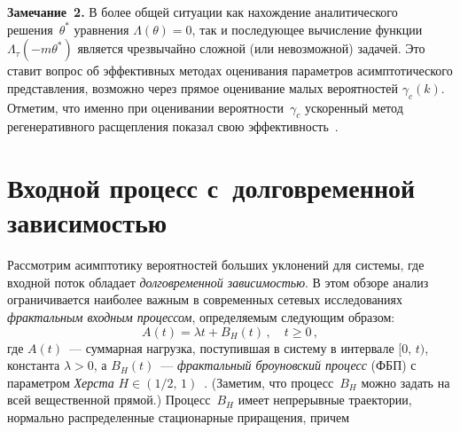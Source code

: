 \begin{multicols}{2}
\smallskip
\noindent
{\bf Замечание~2.} В более общей ситуации как
нахождение аналитического решения~$\theta^*$ уравнения
$\Lambda(\theta)=0$, так и последующее вычисление функции
$\Lambda_\tau(-m\theta^* )$ является чрезвычайно сложной (или
невозможной) задачей. Это ставит вопрос об эффективных методах
 оценивания параметров асимптотического представления,
возможно через прямое оценивание малых вероятностей $\gamma_c(k)$.
Отметим, что именно при оценивании вероятности~$\gamma_c$
ускоренный метод регенеративного расщепления показал свою
эффективность~\cite{BorMor}.


\section{Входной процесс с~долговременной зависимостью}

Рассмотрим асимптотику вероятностей больших уклонений для
системы, где входной поток обладает {\it долговременной
зависимостью}. В этом обзоре анализ ограничивается наиболее
важным в современных сетевых исследованиях {\it фрактальным
входным процессом}, определяемым следующим образом:
\begin{equation}
A(t)=\lambda t+ B_H(t)\,,\quad t\ge 0\,,
\label{LongRD}
\end{equation}
где $A(t)$~--- суммарная нагрузка, поступившая в сис\-те\-му в интервале
$[0,\,t)$, константа $\lambda>0$, а $B_H(t)$~--- {\it фрактальный
броуновский процесс} (ФБП) с параметром {\it Херста} $H\in
(1/2,\,1)$~\cite{Norros}. (Заметим, что процесс~$B_H$ можно задать
на всей вещественной прямой.) Процесс~$B_H$ имеет непрерывные траектории, нормально
распределенные стационарные приращения, причем

\pagebreak


\end{multicols}

